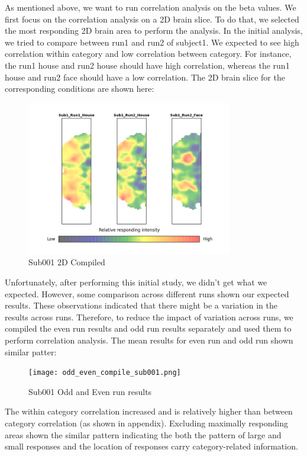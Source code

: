 \documentclass[11pt,twocolumn]{article}
\begin{document}
As mentioned above, we want to run correlation analysis on the beta values.
We first focus on the correlation analysis on a 2D brain slice. To do that, 
we selected the most responding 2D brain area to perform the analysis. 
In the initial analysis, we tried to compare between run1 and 
run2 of subject1. We expected to see high correlation within category 
and low correlation between category. For instance, the run1 house and 
run2 house should have high correlation, whereas the run1 house and run2 face 
should have a low correlation. The 2D brain slice for the corresponding 
conditions are shown here:

\begin{figure}[h!]
\centering
\includegraphics[width=90mm]{sub001_run_figure_compile.png}
\caption{Sub001 2D Compiled}
\end{figure}

Unfortunately, after performing this initial study, we didn’t get what 
we expected. However, some comparison across different runs shown our 
expected results. These observations indicated that there might be a 
variation in the results across runs. 
Therefore, to reduce the impact of variation across runs, we compiled the 
even run results and odd run results separately and used them to perform
correlation analysis. The mean results for even run and odd run shown similar
patter:

\begin{figure}[h!]                                                              
\centering                                                                      
\texttt{[image: odd\_even\_compile\_sub001.png]}                                                 
\caption{Sub001 Odd and Even run results}                                                    
\end{figure}

The within category correlation increased and is relatively  higher than
between category correlation (as shown in appendix). Excluding maximally
responding areas shown the similar pattern indicating the both the pattern of
large and small responses and the location of responses carry category-related
information.\\
\end{document}
